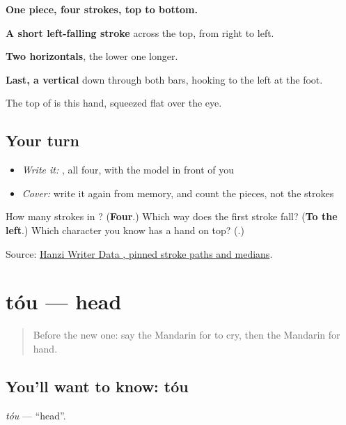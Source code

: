 \begin{quote}
\end{quote}

\textbf{One piece, four strokes, top to bottom.}

\textbf{A short left-falling stroke} across the top, from right to left.

\textbf{Two horizontals}, the lower one longer.

\textbf{Last, a vertical} down through both bars, hooking to the left at the foot.

The top of  is this hand, squeezed flat over the eye.

\subsection*{Your turn}
\begin{itemize}
\raggedright
  \item \emph{Write it:} , all four, with the model in front of you
  \item \emph{Cover:} write it again from memory, and count the pieces, not the strokes
\end{itemize}

\begin{tcolorbox}[breakable,colback=teal!4,colframe=teal!35!black,title={Before you move on}]
How many strokes in ? (\textbf{Four}.) Which way does the first stroke fall? (\textbf{To the left}.) Which character you know has a hand on top? (\textbf{}.)

Source: \href{https://raw.githubusercontent.com/chanind/hanzi-writer-data/68d10a4b21150cae5e1ebbd223eed289cf32d90c/data/\%E6\%89\%8B.json}{Hanzi Writer Data , pinned stroke paths and medians}.
\end{tcolorbox}
\section[tóu]{tóu — head}

\label{lesson:ZH-C52-tou}



\begin{quote}
Before the new one: say the Mandarin for to cry, then the Mandarin for hand.
\end{quote}

\subsection*{You'll want to know: tóu}
\emph{tóu} — \textquotedblleft{}head\textquotedblright{}.

